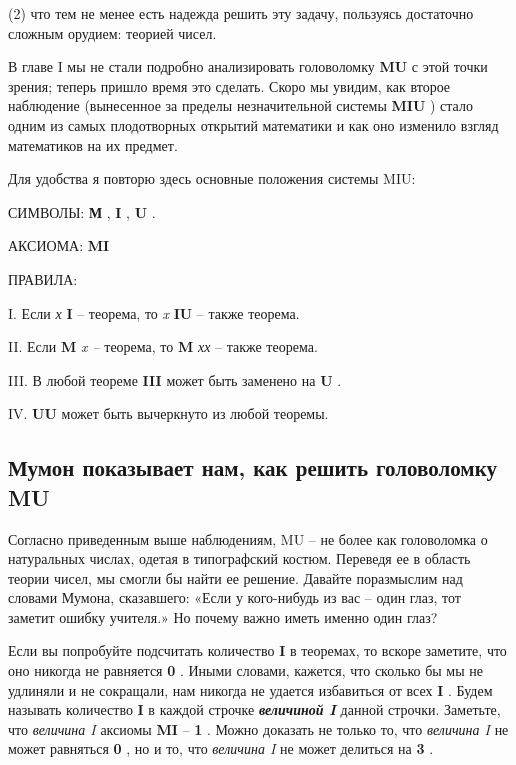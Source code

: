 \documentclass[../main.tex]{subfiles}
\begin{document}
(2) что тем не менее есть надежда решить эту задачу, пользуясь достаточно сложным орудием: теорией чисел.

В главе I мы не стали подробно анализировать головоломку \textbf{MU} с этой точки зрения; теперь пришло время это сделать. Скоро мы увидим, как второе наблюдение (вынесенное за пределы незначительной системы \textbf{MIU} ) стало одним из самых плодотворных открытий математики и как оно изменило взгляд математиков на их предмет.

Для удобства я повторю здесь основные положения системы MIU:

СИМВОЛЫ: \textbf{М} , \textbf{I} , \textbf{U} .

АКСИОМА: \textbf{MI}

ПРАВИЛА:

I. Если \emph{х} \textbf{I} \--- теорема, то \emph{x} \textbf{IU} \--- также теорема.

II. Если \textbf{M} \emph{x \---} теорема, то \textbf{M} \emph{хх} \--- также теорема.

III. В любой теореме \textbf{III} может быть заменено на \textbf{U} .

IV. \textbf{UU} может быть вычеркнуто из любой теоремы.


\subsection{Мумон показывает нам, как решить головоломку MU}

Согласно приведенным выше наблюдениям, MU \--- не более как головоломка о натуральных числах, одетая в типографский костюм. Переведя ее в область теории чисел, мы смогли бы найти ее решение. Давайте поразмыслим над словами Мумона, сказавшего: «Если у кого-нибудь из вас \--- один глаз, тот заметит ошибку учителя.» Но почему важно иметь именно один глаз?

Если вы попробуйте подсчитать количество \textbf{I} в теоремах, то вскоре заметите, что оно никогда не равняется \textbf{0} . Иными словами, кажется, что сколько бы мы не удлиняли и не сокращали, нам никогда не удается избавиться от всех \textbf{I} . Будем называть количество \textbf{I} в каждой строчке \emph{\textbf{величиной I}} данной строчки. Заметьте, что \emph{величина I} аксиомы \textbf{MI} \--- \textbf{1} . Можно доказать не только то, что \emph{величина I} не может равняться \textbf{0} , но и то, что \emph{величина I} не может делиться на \textbf{3} .
\end{document}
